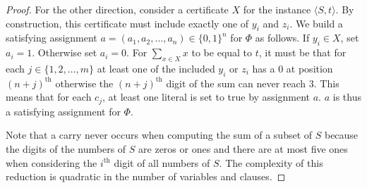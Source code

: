 \documentclass{article}
\newcommand{\nth}[1]{#1^{\text{th}}}
\begin{document}
\begin{proof}
	For the other direction, consider a certificate \(X\) for the instance
	\(\langle S,t\rangle\). By construction, this certificate must include
	exactly one of \(y_i\) and \(z_i\). We build a satisfying assignment \(a =
	(a_1,a_2,\ldots,a_n) \in \{0,1\}^n\) for \(\Phi\) as follows. If \(y_i \in
	X\), set \(a_i = 1\). Otherwise set \(a_i = 0\). For \(\sum_{x \in X} x\)
	to be equal to \(t\), it must be that for each \(j \in \{1,2,\ldots,m\}\)
	at least one of the included \(y_i\) or \(z_i\) has a \(0\) at position
	\(\nth{(n+j)}\) otherwise the \(\nth{(n+j)}\) digit of the sum can never
	reach \(3\). This means that for each \(c_j\), at least one literal is set
	to true by assignment \(a\). \(a\) is thus a satisfying assignment for
	\(\Phi\).

	Note that a carry never occurs when computing the sum of a subset of \(S\)
	because the digits of the numbers of \(S\) are zeros or ones and there are
	at most five ones when considering the \(\nth{i}\) digit of all numbers of
	\(S\). The complexity of this reduction is quadratic in the number of
	variables and clauses.
\end{proof}
\end{document}
